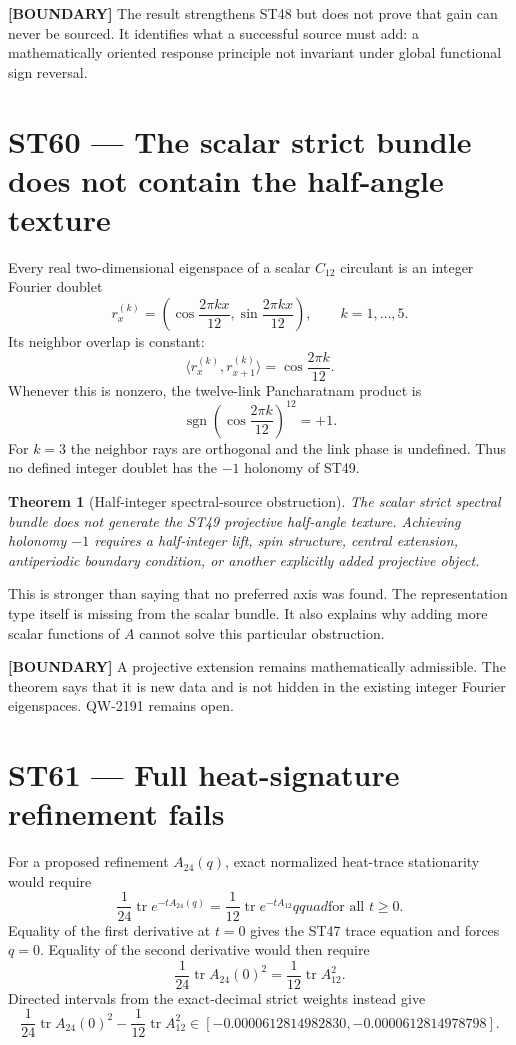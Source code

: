 \documentclass[11pt,a4paper]{article}
\newtheorem{theorem}{Theorem}[section]
\newcommand{\statusboundary}{\textcolor{orange!80!black}{\textbf{[BOUNDARY]}}}
\begin{document}
\statusboundary{} The result strengthens ST48 but does not prove that gain can never be sourced. It identifies what a successful source must add: a mathematically oriented response principle not invariant under global functional sign reversal.

\section{ST60 --- The scalar strict bundle does not contain the half-angle texture}

Every real two-dimensional eigenspace of a scalar $C_{12}$ circulant is an integer Fourier doublet
\[
r_x^{(k)}=\left(\cos\frac{2\pi kx}{12},\sin\frac{2\pi kx}{12}\right),
\qquad k=1,\ldots,5.
\]
Its neighbor overlap is constant:
\[
\langle r_x^{(k)},r_{x+1}^{(k)}\rangle=\cos\frac{2\pi k}{12}.
\]
Whenever this is nonzero, the twelve-link Pancharatnam product is
\[
\operatorname{sgn}\left(\cos\frac{2\pi k}{12}\right)^{12}=+1.
\]
For $k=3$ the neighbor rays are orthogonal and the link phase is undefined. Thus no defined integer doublet has the $-1$ holonomy of ST49.

\begin{theorem}[Half-integer spectral-source obstruction]
The scalar strict spectral bundle does not generate the ST49 projective half-angle texture. Achieving holonomy $-1$ requires a half-integer lift, spin structure, central extension, antiperiodic boundary condition, or another explicitly added projective object.
\end{theorem}

This is stronger than saying that no preferred axis was found. The representation type itself is missing from the scalar bundle. It also explains why adding more scalar functions of $A$ cannot solve this particular obstruction.

\statusboundary{} A projective extension remains mathematically admissible. The theorem says that it is new data and is not hidden in the existing integer Fourier eigenspaces. QW-2191 remains open.

\section{ST61 --- Full heat-signature refinement fails}

For a proposed refinement $A_{24}(q)$, exact normalized heat-trace stationarity would require
\[
\frac1{24}\operatorname{tr}e^{-tA_{24}(q)}
=\frac1{12}\operatorname{tr}e^{-tA_{12}}qquad\text{for all }t\ge0.
\]
Equality of the first derivative at $t=0$ gives the ST47 trace equation and forces $q=0$. Equality of the second derivative would then require
\[
\frac1{24}\operatorname{tr}A_{24}(0)^2
=\frac1{12}\operatorname{tr}A_{12}^2.
\]
Directed intervals from the exact-decimal strict weights instead give
\[
\frac1{24}\operatorname{tr}A_{24}(0)^2-
\frac1{12}\operatorname{tr}A_{12}^2
\in[-0.0000612814982830,-0.0000612814978798].
\]
\end{document}

